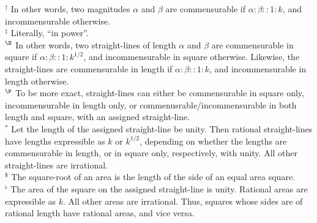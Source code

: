 {\footnotesize\noindent $^\dag$ In other words, two magnitudes $\alpha$ and
$\beta$ are commensurable if $\alpha:\beta::1:k$, and incommensurable otherwise.\\[0.5ex]
$^\ddag$ Literally, ``in power''.\\[0.5ex]
$^\S$  In other words, two straight-lines of length $\alpha$ and $\beta$ are commensurable in square if $\alpha : \beta::1:k^{1/2}$,  and incommensurable in square otherwise. Likewise, the straight-lines
are commensurable in length if $\alpha:\beta::1:k$, and incommensurable in length otherwise.\\[0.5ex]
$^\P$ To be more exact, straight-lines can either be commensurable in square only, incommensurable in length only, or commenusrable/incommensurable in both
length and square, with an assigned straight-line.\\[0.5ex]
$^\ast$ Let the length of the assigned straight-line be unity. Then rational
straight-lines have lengths expressible as $k$ or $k^{1/2}$, depending on whether the lengths are commensurable in length, or in square only, respectively,
with unity.  All other straight-lines are irrational.\\[0.5ex]
$^\$$ The square-root of an area is the length of the side of an equal area square.\\[0.5ex]
$^\flat$ The area of the  square 
on the assigned straight-line is unity. Rational areas are expressible as $k$.  All other areas are irrational. Thus, squares whose
sides are of rational length have  rational areas, and {\rm vice versa}.}

